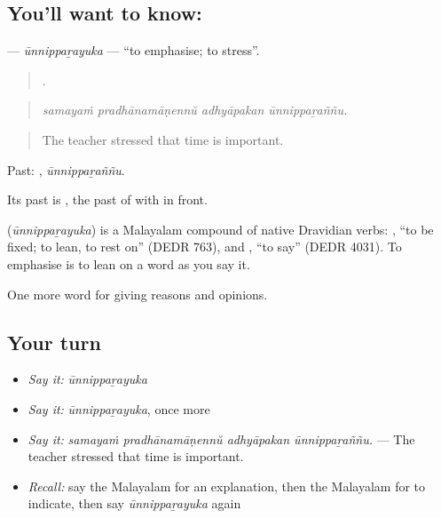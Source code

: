 \subsection*{You'll want to know: }
\textbf{} — \emph{ūnnippaṟayuka} — \textquotedblleft{}to emphasise; to stress\textquotedblright{}.

\begin{quote}
   .
\end{quote}

\begin{quote}
\emph{samayaṁ pradhānamāṇennŭ adhyāpakan ūnnippaṟaññu.}
\end{quote}

\begin{quote}
The teacher stressed that time is important.
\end{quote}

Past: , \emph{ūnnippaṟaññu}.

Its past is , the past of  with  in front.

\begin{cousinweb}
\textbf{} (\emph{ūnnippaṟayuka}) is a Malayalam compound of native Dravidian verbs: , \textquotedblleft{}to be fixed; to lean, to rest on\textquotedblright{} (DEDR 763), and , \textquotedblleft{}to say\textquotedblright{} (DEDR 4031). To emphasise is to lean on a word as you say it.
\end{cousinweb}

\begin{grammarlens}[title={What you've built}]
One more word for giving reasons and opinions.
\end{grammarlens}

\subsection*{Your turn}
\begin{itemize}
\raggedright
  \item \emph{Say it:} \emph{ūnnippaṟayuka}
  \item \emph{Say it:} \emph{ūnnippaṟayuka}, once more
  \item \emph{Say it:} \emph{samayaṁ pradhānamāṇennŭ adhyāpakan ūnnippaṟaññu.} — The teacher stressed that time is important.
  \item \emph{Recall:} say the Malayalam for an explanation, then the Malayalam for to indicate, then say \emph{ūnnippaṟayuka} again
\end{itemize}

